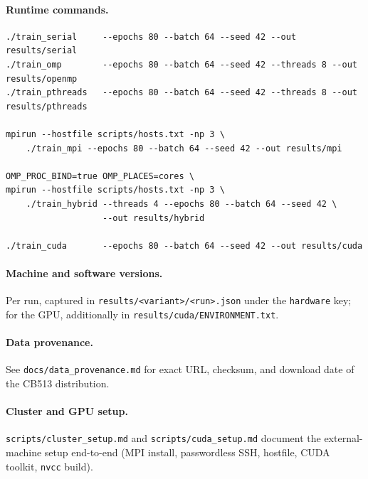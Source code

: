 \documentclass[11pt,a4paper]{article}
\begin{document}
\paragraph{Runtime commands.}
\begin{lstlisting}
./train_serial     --epochs 80 --batch 64 --seed 42 --out results/serial
./train_omp        --epochs 80 --batch 64 --seed 42 --threads 8 --out results/openmp
./train_pthreads   --epochs 80 --batch 64 --seed 42 --threads 8 --out results/pthreads

mpirun --hostfile scripts/hosts.txt -np 3 \
    ./train_mpi --epochs 80 --batch 64 --seed 42 --out results/mpi

OMP_PROC_BIND=true OMP_PLACES=cores \
mpirun --hostfile scripts/hosts.txt -np 3 \
    ./train_hybrid --threads 4 --epochs 80 --batch 64 --seed 42 \
                   --out results/hybrid

./train_cuda       --epochs 80 --batch 64 --seed 42 --out results/cuda
\end{lstlisting}

\paragraph{Machine and software versions.} Per run, captured in
\texttt{results/<variant>/<run>.json} under the \texttt{hardware} key;
for the GPU, additionally in \texttt{results/cuda/ENVIRONMENT.txt}.

\paragraph{Data provenance.} See \texttt{docs/data\_provenance.md} for
exact URL, checksum, and download date of the CB513 distribution.

\paragraph{Cluster and GPU setup.}
\texttt{scripts/cluster\_setup.md} and \texttt{scripts/cuda\_setup.md}
document the external-machine setup end-to-end (MPI install, passwordless
SSH, hostfile, CUDA toolkit, \texttt{nvcc} build).
\end{document}
